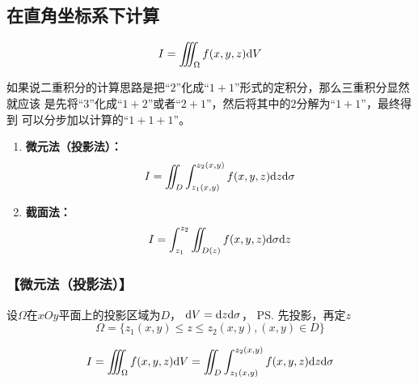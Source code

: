 \subsection{在直角坐标系下计算}

$${I=\iiint_{\Omega}f(x,y,z)\mathrm{d} V}$$

如果说二重积分的计算思路是把“$2$”化成“$1+1$”形式的定积分，那么三重积分显然就应该
是先将“$3$”化成“$1+2$”或者“$2+1$”，然后将其中的$2$分解为“$1+1$”，最终得到
可以分步加以计算的“$1+1+1$”。

\begin{enumerate}
  \item {\bf 微元法（投影法）：}
  $$I=\iint_D\int_{z_1(x,y)}^{z_2(x,y)}f(x,y,z)\mathrm{d} z\mathrm{d}\sigma$$
  \item {\bf 截面法：}
  $$I=\int_{z_1}^{z_2}\iint_{D(z)}f(x,y,z)\mathrm{d}\sigma \mathrm{d} z$$
\end{enumerate}

\subsubsection{【微元法（投影法）】}

设$\Omega$在$xOy$平面上的投影区域为$D$， $\mathrm{d} V=\mathrm{d} z\mathrm{d}\sigma$， \ps{先投影，再定$z$}
$$\Omega=\{z_1(x,y)\leq z\leq z_2(x,y), (x,y)\in D\}$$

\begin{center}
\end{center}

$${I=\iiint_{\Omega}f(x,y,z)\mathrm{d}
V=\iint_D\int_{z_1(x,y)}^{z_2(x,y)}f(x,y,z)\mathrm{d} z\mathrm{d}\sigma}$$


